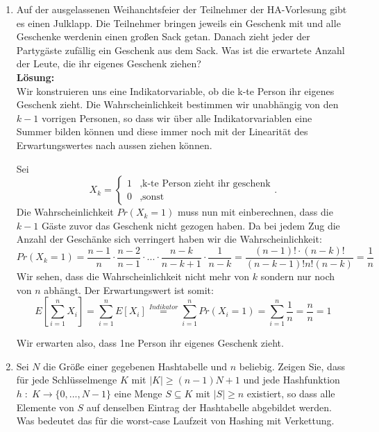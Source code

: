 \documentclass[11pt,a4paper,ngerman]{article}
\begin{document}
\begin{enumerate}[\bfseries a)]

\item Auf der ausgelassenen Weihanchtsfeier der Teilnehmer der HA-Vorlesung gibt es einen Julklapp. Die Teilnehmer bringen jeweils ein Geschenk mit und alle Geschenke werdenin einen großen Sack getan. Danach zieht jeder der Partygäste zufällig ein Geschenk aus dem Sack. Was ist die erwartete Anzahl der Leute, die ihr eigenes Geschenk ziehen?\\

\textbf{Lösung:}\\
Wir konstruieren uns eine Indikatorvariable, ob die k-te Person ihr eigenes Geschenk zieht. Die Wahrscheinlichkeit bestimmen wir unabhängig von den $k-1$ vorrigen Personen, so dass wir über alle Indikatorvariablen eine Summer bilden können und diese immer noch mit der Linearität des Erwartungswertes nach aussen ziehen können.\\

\pagebreak

Sei
$$
X_k = \left\{ \begin{array}{lr} 1 &,\text{k-te Person zieht ihr geschenk}\\ 0 &, \text{sonst}\end{array} \right. .
$$
Die Wahrscheinlichkeit $Pr(X_k = 1)$  muss nun mit einberechnen, dass die $k-1$ Gäste zuvor das Geschenk nicht gezogen haben. Da bei jedem Zug die Anzahl der Geschänke sich verringert haben wir die Wahrscheinlichkeit:
$$
Pr(X_k = 1) = \frac{n-1}{n} \cdot \frac{n-2}{n-1} \cdot ... \cdot \frac{n - k}{n-k +1} \cdot \frac{1}{n-k} = \frac{(n-1)! \cdot (n-k)! }{(n-k -1)! n! (n-k)} = \frac{1}{n}
$$
Wir sehen, dass  die Wahrscheinlichkeit nicht mehr von $k$ sondern nur noch von $n$ abhängt. Der Erwartungswert ist somit:\\
$$
E \left[ \sum_{i=1}^{n} X_i \right] = \sum_{i=1}^n E \left[ X_i \right] \stackrel{Indikator}{=} \sum_{i=1}^n Pr(X_i=1) = \sum_{i=1}^n \frac{1}{n} = \frac{n}{n} = 1
$$

Wir erwarten also, dass 1ne Person ihr eigenes Geschenk zieht.

\item Sei $N$ die Größe einer gegebenen Hashtabelle und $n$ beliebig. Zeigen Sie, dass für jede Schlüsselmenge $K$ mit $|K| \geq (n-1)N+1$ und jede Hashfunktion $h \; : \; K \rightarrow \{ 0 , ... , N-1\}$ eine Menge $S \subseteq K$ mit $|S| \geq n$ existiert, so dass alle Elemente von $S$ auf denselben Eintrag der Hashtabelle abgebildet werden.\\
Was bedeutet das für die worst-case Laufzeit von Hashing mit Verkettung.\\


\end{enumerate}
\end{document}
